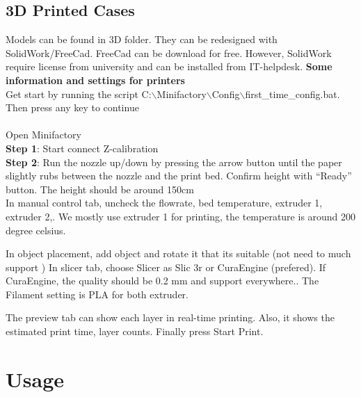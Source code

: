 \documentclass{report}
\begin{document}
\subsection{3D Printed Cases}
Models can be found in 3D folder. They can be redesigned with SolidWork/FreeCad. FreeCad can be download for free. However, SolidWork require license from university and can be installed from IT-helpdesk.
\textbf{Some information and settings for printers} \\
Get start by running the script 
C:$\backslash$Minifactory$\backslash$Config$\backslash$first\_time\_config.bat.
Then press any key to continue\\
\\
Open Minifactory\\
\textbf{Step 1}: Start connect Z-calibration\\
\textbf{Step 2}: Run the nozzle up/down by pressing the arrow button until the paper slightly rubs between the nozzle and the print bed. Confirm height with “Ready” button. The height should be around 150cm\\
In manual control tab, uncheck the flowrate, bed temperature, extruder 1, extruder 2,. We mostly use extruder 1 for printing, the temperature is around 200 degree celsius.  

In object placement, add object and rotate it that its suitable (not need to much support )
In slicer tab, choose Slicer as Slic 3r or CuraEngine (prefered). If CuraEngine, the quality should be 0.2 mm and support everywhere.. The Filament setting is PLA for both extruder.

The preview tab can show each layer in real-time printing. Also, it shows the estimated print time, layer counts. Finally press Start Print.

\section{Usage}
\end{document}
